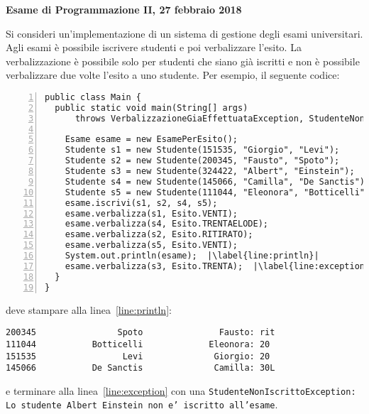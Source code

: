\documentclass{article}[10pt]
\begin{document}
\begin{center} {\bf Esame di Programmazione II, 27 febbraio 2018}\end{center}

Si consideri un'implementazione di un sistema di gestione degli esami universitari.
Agli esami \`e possibile iscrivere studenti e poi verbalizzare l'esito. La verbalizzazione
\`e possibile solo per studenti che siano gi\`a iscritti e non \`e possibile
verbalizzare due volte l'esito a uno studente. Per esempio, il seguente codice:

\begin{lstlisting}[frame=l,numbers=left]
public class Main {
  public static void main(String[] args)
      throws VerbalizzazioneGiaEffettuataException, StudenteNonIscrittoException {

    Esame esame = new EsamePerEsito();
    Studente s1 = new Studente(151535, "Giorgio", "Levi");
    Studente s2 = new Studente(200345, "Fausto", "Spoto");
    Studente s3 = new Studente(324422, "Albert", "Einstein");
    Studente s4 = new Studente(145066, "Camilla", "De Sanctis");
    Studente s5 = new Studente(111044, "Eleonora", "Botticelli");
    esame.iscrivi(s1, s2, s4, s5);
    esame.verbalizza(s1, Esito.VENTI);
    esame.verbalizza(s4, Esito.TRENTAELODE);
    esame.verbalizza(s2, Esito.RITIRATO);
    esame.verbalizza(s5, Esito.VENTI);
    System.out.println(esame);  |\label{line:println}|
    esame.verbalizza(s3, Esito.TRENTA);  |\label{line:exception}|
  }
}
\end{lstlisting}
%
deve stampare alla linea~\ref{line:println}:
%
\begin{lstlisting}
200345                Spoto               Fausto: rit
111044           Botticelli             Eleonora: 20
151535                 Levi              Giorgio: 20
145066           De Sanctis              Camilla: 30L
\end{lstlisting}  
%
e terminare alla linea~\ref{line:exception} con una \texttt{StudenteNonIscrittoException: Lo studente Albert Einstein non e' iscritto all'esame}.
\end{document}
